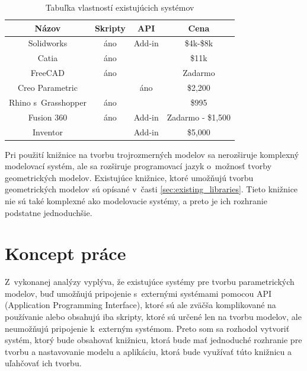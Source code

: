 \begin{table}[H]
\centering
\begin{tabular}{ |c|c|c|c| }
 \hline
 Názov & Skripty & API & Cena \\
 \hline
 \hline
 Solidworks & áno & Add-in & \$4k-\$8k \\ 
  \hline
 Catia & áno &  & \$11k \\  
  \hline
 FreeCAD & áno &  & Zadarmo \\  
  \hline
 Creo Parametric &  & áno &  \$2,200 \\
  \hline
 Rhino s~Grasshopper &  áno &  & \$995 \\
  \hline
 Fusion 360 & áno &  Add-in & Zadarmo - \$1,500 \\
  \hline
 Inventor &  &  Add-in & \$5,000   \\
  \hline
\end{tabular}
\caption{Tabuľka vlastností existujúcich systémov}
 \label{tab:systemsAndLibs}
\end{table}




Pri použití knižnice na tvorbu trojrozmerných modelov sa nerozširuje komplexný modelovací systém, ale sa rozširuje programovací jazyk o~možnosť tvorby geometrických modelov. Existujúce knižnice, ktoré umožňujú tvorbu geometrických modelov sú opísané v~časti \ref{sec:existing_libraries}.
Tieto knižnice nie sú také komplexné ako modelovacie systémy, a preto je ich rozhranie podstatne jednoduchšie.







\section{Koncept práce}
Z~vykonanej analýzy vyplýva, že existujúce systémy pre tvorbu parametrických modelov, buď umožňujú pripojenie s~externými systémami pomocou API (Application Programming Interface), ktoré sú ale zväčša komplikované na používanie alebo obsahujú iba skripty, ktoré sú určené len na tvorbu modelov, ale neumožňujú pripojenie k~externým systémom. Preto som sa rozhodol vytvoriť systém, ktorý bude obsahovať knižnicu, ktorá bude mať jednoduché rozhranie pre tvorbu a nastavovanie modelu a aplikáciu, ktorá bude využívať túto knižnicu a uľahčovať ich tvorbu. 



